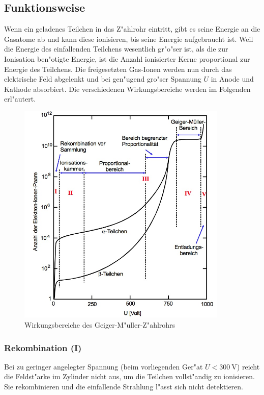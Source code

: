 	\subsection{Funktionsweise}
	\label{subsec:funktionsweise}
		Wenn ein geladenes Teilchen in das Z"ahlrohr eintritt, gibt es seine Energie an die Gas\-atome ab und kann diese ionisieren, bis seine Energie aufgebraucht ist.
		Weil die Energie des einfallenden Teilchens wesentlich gr"o"ser ist, als die zur Ionisation ben"otigte Energie, ist die Anzahl ionisierter Kerne proportional zur Energie des Teilchens.
		Die freigesetzten Gas-Ionen werden nun durch das elektrische Feld abgelenkt und bei gen"ugend gro"ser Spannung $U$ in Anode und Kathode absorbiert.
		Die verschiedenen Wirkungsbereiche werden im Folgenden erl"autert.

		\begin{figure}[h]
			\centering
			\includegraphics[width = 10cm]{img/bereiche.jpeg}
			\caption{Wirkungsbereiche des Geiger-M"uller-Z"ahlrohrs \cite{anleitung}}
			\label{fig:bereiche}
		\end{figure}

		\subsubsection{Rekombination (I)}
		\label{subsubsec:rekombination}
			Bei zu geringer angelegter Spannung (beim vorliegenden Ger"at $U < \SI{300}{\volt}$) reicht die Feldst"arke im Zylinder nicht aus, um die Teilchen vollst"andig zu ionisieren.
			Sie rekombinieren und die einfallende Strahlung l"asst sich nicht detektieren.

